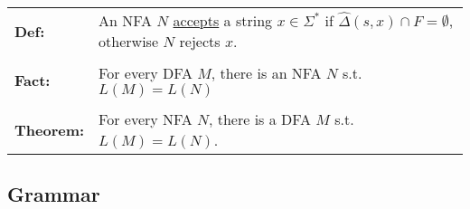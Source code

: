 \documentclass[11pt]{article}
\begin{document}
\begin{tabular}{ll}
{\bf Def:} & An NFA $N$ \underline{accepts} a string $x\in\Sigma^*$ if $\hat{\Delta}(s,x)\cap F=\emptyset$, otherwise $N$ rejects $x$. \\
\\
{\bf Fact:} & For every DFA $M$, there is an NFA $N$ s.t. $L(M)=L(N)$ \\
\\
{\bf Theorem:} & For every NFA $N$, there is a DFA $M$ s.t. $L(M)=L(N)$. \\
\end{tabular}

\subsection{Grammar}
\end{document}
